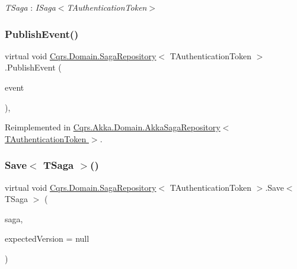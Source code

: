 \begin{Desc}
\item[Type Constraints]\begin{description}
\item[{\em T\+Saga} : {\em I\+Saga$<$T\+Authentication\+Token$>$}]\end{description}
\end{Desc}
\mbox{\label{classCqrs_1_1Domain_1_1SagaRepository_a1dec03959e4d859c6cf2be0507b1bc05}} 
\subsubsection{\texorpdfstring{Publish\+Event()}{PublishEvent()}}
{\footnotesize\ttfamily virtual void \hyperlink{classCqrs_1_1Domain_1_1SagaRepository}{Cqrs.\+Domain.\+Saga\+Repository}$<$ T\+Authentication\+Token $>$.Publish\+Event (\begin{DoxyParamCaption}\item[{\hyperlink{interfaceCqrs_1_1Events_1_1ISagaEvent}{I\+Saga\+Event}$<$ T\+Authentication\+Token $>$ @}]{event }\end{DoxyParamCaption})\hspace{0.3cm}{\ttfamily [protected]}, {\ttfamily [virtual]}}



Reimplemented in \hyperlink{classCqrs_1_1Akka_1_1Domain_1_1AkkaSagaRepository_a7f6375bb99e680792466fb420232a535}{Cqrs.\+Akka.\+Domain.\+Akka\+Saga\+Repository$<$ T\+Authentication\+Token $>$}.

\mbox{\label{classCqrs_1_1Domain_1_1SagaRepository_a84cae424cb01de22864ae7d960007cd0}} 
\subsubsection{\texorpdfstring{Save$<$ T\+Saga $>$()}{Save< TSaga >()}}
{\footnotesize\ttfamily virtual void \hyperlink{classCqrs_1_1Domain_1_1SagaRepository}{Cqrs.\+Domain.\+Saga\+Repository}$<$ T\+Authentication\+Token $>$.Save$<$ T\+Saga $>$ (\begin{DoxyParamCaption}\item[{T\+Saga}]{saga,  }\item[{int?}]{expected\+Version = {\ttfamily null} }\end{DoxyParamCaption})\hspace{0.3cm}{\ttfamily [virtual]}}



